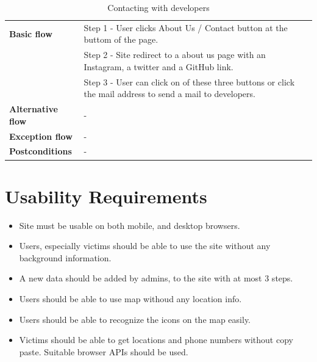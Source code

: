 \begin{center}
\begin{table}[H]
\begin{tabular}{| m{3cm}| m{10cm} |}
            \hline
            \textbf{Basic flow}       & Step 1 - User clicks About Us / Contact button at the buttom of the page.                                 \\
                                      & Step 2 - Site redirect to a about us page with an Instagram, a twitter and a GitHub link.                 \\
                                      & Step 3 - User can click on of these three buttons or click the mail address to send a mail to developers. \\
            \hline
            \textbf{Alternative flow} & -                                                                                                         \\
            \hline
            \textbf{Exception flow}   & -                                                                                                         \\
            \hline
            \textbf{Postconditions}   & -                                                                                                         \\
            \hline
        \end{tabular}
        \caption[Contacting with developers]{Contacting with developers}
    \end{table}
\end{center}

\section{Usability Requirements}
\begin{itemize}
    \item Site must be usable on both mobile, and desktop browsers.
    \item Users, especially victims should be able to use the site without any background information.
    \item A new data should be added by admins, to the site with at most 3 steps.
    \item Users should be able to use map withoud any location info.
    \item Users should be able to recognize the icons on the map easily.
    \item Victims should be able to get locations and phone numbers without copy paste. Suitable browser APIs should be used.
\end{itemize}

